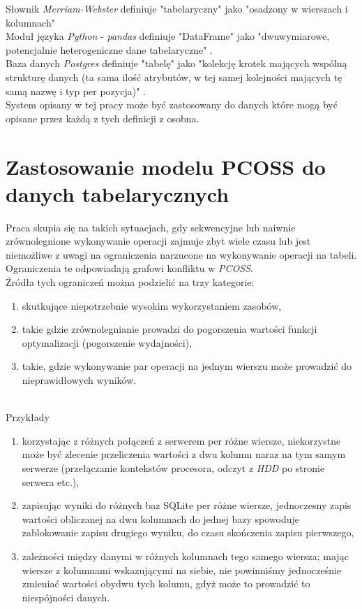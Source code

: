 \documentclass[brudnopis]{xmgr}
\begin{document}
Słownik \emph{Merriam-Webster} definiuje "tabelaryczny" jako "osadzony w wierszach i kolumnach" \cite{MW:TAB}
\medskip\\

Moduł języka \emph{Python} - \emph{pandas} definiuje "DataFrame" jako "dwuwymiarowe, potencjalnie heterogeniczne dane tabelaryczne" \cite{P:DF}.
\medskip\\

Baza danych \emph{Postgres} definiuje "tabelę" jako "kolekcję krotek mających wspólną strukturę danych (ta sama ilość atrybutów, w tej samej kolejności mających tę samą nazwę i typ per pozycja)" \cite{PSQL:TAB}.
\medskip\\

System opisany w tej pracy może być zastosowany do danych które mogą być opisane przez każdą z tych definicji z osobna.

\chapter{Zastosowanie modelu PCOSS do danych tabelarycznych}

Praca skupia się na takich sytuacjach, gdy sekwencyjne lub naiwnie zrównolegnione wykonywanie operacji zajmuje zbyt wiele czasu lub jest niemożliwe z uwagi na ograniczenia narzucone na wykonywanie operacji na tabeli.
Ograniczenia te odpowiadają grafowi konfliktu w \emph{PCOSS}.
\medskip\\

Źródła tych ograniczeń można podzielić na trzy kategorie:
\begin{enumerate}
    \item skutkujące niepotrzebnie wysokim wykorzystaniem zasobów,
    \item takie gdzie zrównolegnianie prowadzi do pogorszenia wartości funkcji optymalizacji (pogorszenie wydajności),
    \item takie, gdzie wykonywanie par operacji na jednym wierszu może prowadzić do nieprawidłowych wyników.
\end{enumerate}
\medskip\\

Przykłady
\begin{enumerate}
    \item korzystając z różnych połączeń z serwerem per różne wiersze, niekorzystne może być zlecenie przeliczenia wartości z dwu kolumn naraz na tym samym serwerze (przełączanie kontekstów procesora, odczyt z \emph{HDD} po stronie serwera etc.),
    \item zapisując wyniki do różnych baz SQLite per różne wiersze, jednoczesny zapis wartości obliczanej na dwu kolumnach do jednej bazy spowoduje zablokowanie zapisu drugiego wyniku, do czasu skończenia zapisu pierwszego,
    \item zależności między danymi w różnych kolumnach tego samego wiersza; mając wiersze z kolumnami wskazującymi na siebie, nie powinniśmy jednocześnie zmieniać wartości obydwu tych kolumn, gdyż może to prowadzić to niespójności danych.
\end{enumerate}
\medskip\\
\end{document}
